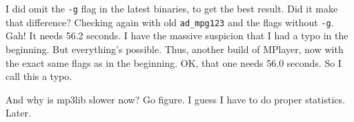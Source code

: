 \documentclass[a4paper,12pt]{scrartcl}
\begin{document}
I did omit the \verb:-g: flag in the latest binaries, to get the best result. Did it make that difference? Checking again with old \verb:ad_mpg123: and the flags without \verb:-g:. Gah! It needs 56.2 seconds.
I have the massive suspicion that I had a typo in the beginning.
But everything's possible. Thus, another build of MPlayer, now with the exact same flags as in the beginning.
OK, that one needs 56.0 seconds. So I call this a typo. 

And why is mp3lib slower now? Go figure. I guess I have to do proper statistics. Later.
\end{document}

